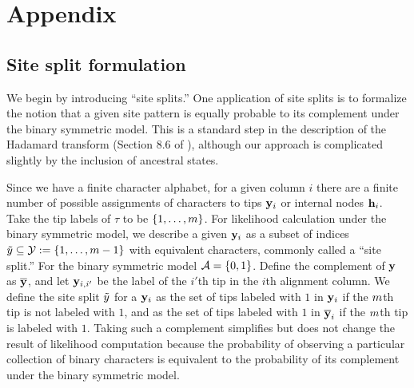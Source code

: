 \section*{Appendix}

\subsection*{Site split formulation}
We begin by introducing ``site splits.''
One application of site splits is to formalize the notion that a given site pattern is equally probable to its complement under the binary symmetric model.
This is a standard step in the description of the Hadamard transform (Section 8.6 of \citet{Semple2003-em}), although our approach is complicated slightly by the inclusion of ancestral states.

Since we have a finite character alphabet, for a given column $i$ there are a finite number of possible assignments of characters to tips $\mathbf{y}_i$ or internal nodes $\mathbf{h}_i$.
Take the tip labels of $\tau$ to be $\{1,\ldots,m\}$.
For likelihood calculation under the binary symmetric model, we describe a given $\mathbf{y}_i$ as a subset of indices $\tilde{y}\subseteq\mathcal{Y}:=\{1,\ldots,m-1\}$ with equivalent characters, commonly called a ``site split.''
For the binary symmetric model $\mathcal{A}=\{0,1\}$.
Define the complement of $\mathbf{y}$ as $\overline{\mathbf{y}}$, and let $\mathbf{y}_{i,i'}$ be the label of the $i'$th tip in the $i$th alignment column.
We define the site split $\tilde{y}$ for a $\mathbf{y}_i$ as the set of tips labeled with $1$ in $\mathbf{y}_i$ if the $m$th tip is not labeled with $1$, and as the set of tips labeled with $1$ in $\overline{\mathbf{y}}_i$ if the $m$th tip is labeled with $1$.
Taking such a complement simplifies but does not change the result of likelihood computation because the probability of observing a particular collection of binary characters is equivalent to the probability of its complement under the binary symmetric model.

